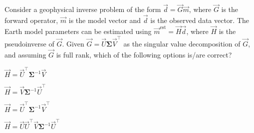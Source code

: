 \item Consider a geophysical inverse problem of the form $\vec{d}=\vec{G}\vec{m}$, where $\vec{G}$ is the forward operator, $\vec{m}$ is the model vector and $\vec{d}$ is the observed data vector. The Earth model parameters can be estimated using $\vec{m}^{\text{est}}=\vec{H}\vec{d}$, where $\vec{H}$ is the pseudoinverse of $\vec{G}$. Given $\vec{G}=\vec{U}\bm{\Sigma} \vec{V}^{\top}$ as the singular value decomposition of $\vec{G}$, and assuming $\vec{G}$ is full rank, which of the following options is/are correct? \hfill{}
\begin{enumerate}
\begin{multicols}{4}
    \item $\vec{H}=\vec{U}^{\top}\bm{\Sigma}^{-1}\vec{V}$
    \item $\vec{H}=\vec{V}\bm{\Sigma}^{-1}\vec{U}^{\top}$
    \item $\vec{H}=\vec{U}^{\top}\bm{\Sigma}^{-1}\vec{V}^{\top}$
    \item $\vec{H}=\vec{U}\vec{U}^{\top}\vec{V}\bm{\Sigma}^{-1}\vec{U}^{\top}$
    \end{multicols}
\end{enumerate}

